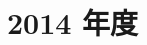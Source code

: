 \documentclass[../../hsm_tok_a.tex]{subfiles}
\begin{document}
    \section{2014 年度}

    

    \clearpage

    
\end{document}
